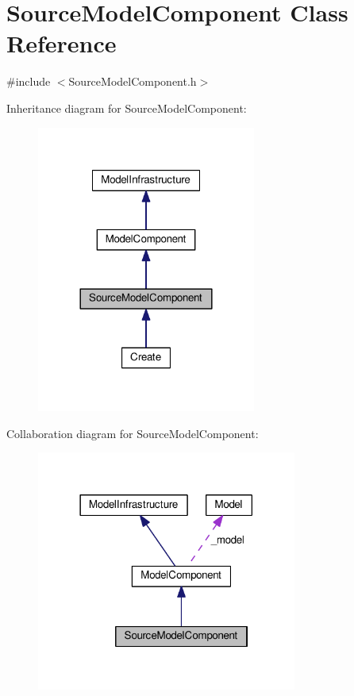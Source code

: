 \hypertarget{class_source_model_component}{}\section{Source\+Model\+Component Class Reference}
\label{class_source_model_component}


{\ttfamily \#include $<$Source\+Model\+Component.\+h$>$}



Inheritance diagram for Source\+Model\+Component\+:
\nopagebreak
\begin{figure}[H]
\begin{center}
\leavevmode
\includegraphics[width=204pt]{class_source_model_component__inherit__graph}
\end{center}
\end{figure}


Collaboration diagram for Source\+Model\+Component\+:
\nopagebreak
\begin{figure}[H]
\begin{center}
\leavevmode
\includegraphics[width=242pt]{class_source_model_component__coll__graph}
\end{center}
\end{figure}
